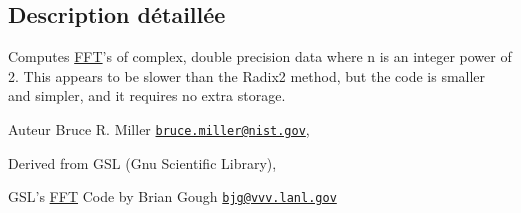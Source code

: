 \subsection{Description détaillée}
Computes \hyperlink{classjnt_1_1scimark2_1_1FFT}{F\-F\-T}'s of complex, double precision data where n is an integer power of 2. This appears to be slower than the Radix2 method, but the code is smaller and simpler, and it requires no extra storage. 

\begin{DoxyAuthor}{Auteur}
Bruce R. Miller \href{mailto:bruce.miller@nist.gov}{\tt bruce.\-miller@nist.\-gov}, 

Derived from G\-S\-L (Gnu Scientific Library), 

G\-S\-L's \hyperlink{classjnt_1_1scimark2_1_1FFT}{F\-F\-T} Code by Brian Gough \href{mailto:bjg@vvv.lanl.gov}{\tt bjg@vvv.\-lanl.\-gov} 
\end{DoxyAuthor}



